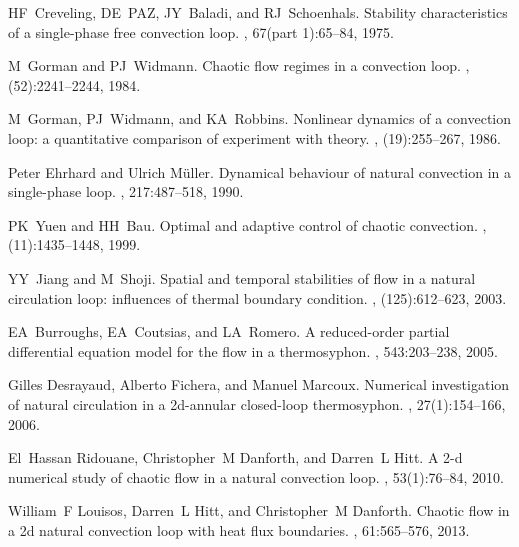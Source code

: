\documentclass[pre,twocolumn,twoside,byrevtex,superscriptaddress]{revtex4}
\begin{document}
\begin{thebibliography}{10}
HF~Creveling, DE~PAZ, JY~Baladi, and RJ~Schoenhals.
\newblock Stability characteristics of a single-phase free convection loop.
, 67(part 1):65--84, 1975.

M~Gorman and PJ~Widmann.
\newblock Chaotic flow regimes in a convection loop.
, (52):2241--2244, 1984.

M~Gorman, PJ~Widmann, and KA~Robbins.
\newblock Nonlinear dynamics of a convection loop: a quantitative comparison of
  experiment with theory.
, (19):255--267, 1986.

Peter Ehrhard and Ulrich M{\"u}ller.
\newblock Dynamical behaviour of natural convection in a single-phase loop.
, 217:487--518, 1990.

PK~Yuen and HH~Bau.
\newblock Optimal and adaptive control of chaotic convection.
, (11):1435--1448, 1999.

YY~Jiang and M~Shoji.
\newblock Spatial and temporal stabilities of flow in a natural circulation
  loop: influences of thermal boundary condition.
, (125):612--623, 2003.

EA~Burroughs, EA~Coutsias, and LA~Romero.
\newblock A reduced-order partial differential equation model for the flow in a
  thermosyphon.
, 543:203--238, 2005.

Gilles Desrayaud, Alberto Fichera, and Manuel Marcoux.
\newblock Numerical investigation of natural circulation in a 2d-annular
  closed-loop thermosyphon.
, 27(1):154--166,
  2006.

El~Hassan Ridouane, Christopher~M Danforth, and Darren~L Hitt.
\newblock A 2-d numerical study of chaotic flow in a natural convection loop.
, 53(1):76--84,
  2010.

William~F Louisos, Darren~L Hitt, and Christopher~M Danforth.
\newblock Chaotic flow in a 2d natural convection loop with heat flux
  boundaries.
, 61:565--576,
  2013.


\end{thebibliography}
\end{document}
